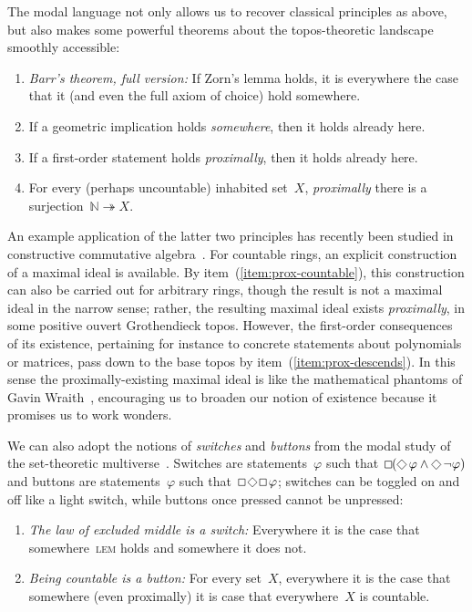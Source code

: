 \documentclass[oneside,reqno]{amsart}
\theoremstyle{definition}
\theoremstyle{plain}
\theoremstyle{remark}
\newcommand{\NN}{\mathbb{N}}
\renewcommand{\_}{\mathpunct{.}\,}
\DeclareMathOperator{\possible}{\text{\tikz[scale=.6ex/1cm,baseline=-.6ex,rotate=45,line width=.1ex]{\draw (-1,-1) rectangle (1,1);}}}
\DeclareMathOperator{\necessary}{\text{\tikz[scale=.6ex/1cm,baseline=-.6ex,line width=.1ex]{\draw (-1,-1) rectangle (1,1);}}}
\newcommand{\?}{\,{:}\,}
\begin{document}
The modal language not only allows us to recover classical principles
as above, but also makes some powerful theorems about the topos-theoretic
landscape smoothly accessible:
\begin{enumerate}
\addtocounter{enumi}{7}
\item \emph{Barr's theorem, full version:} If Zorn's lemma holds, it is
everywhere the case that it (and even the full axiom of choice) hold somewhere.
\item If a geometric implication holds \emph{somewhere}, then it holds already here.
\item \label{item:prox-descends}
If a first-order statement holds \emph{proximally}, then it holds already here.
\item \label{item:prox-countable}
For every (perhaps uncountable) inhabited set~$X$, \emph{proximally} there is a
surjection~$\NN \twoheadrightarrow X$.
\end{enumerate}
An example application of the latter two principles
has recently been studied in constructive
commutative algebra~\cite{blechschmidt-schuster:constructive-maximal-ideals}.
For countable rings, an explicit construction of a maximal ideal is available.
By item~(\ref{item:prox-countable}), this construction can also be carried out
for arbitrary rings, though the result is not a maximal ideal in the narrow
sense; rather, the resulting maximal ideal exists \emph{proximally}, in some
positive ouvert Grothendieck topos. However, the first-order consequences of
its existence, pertaining for instance to concrete statements about polynomials
or matrices, pass down to the base topos by item~(\ref{item:prox-descends}).
In this sense the proximally-existing maximal ideal is like the mathematical
phantoms of Gavin Wraith~\cite{xxx}, encouraging us to broaden our notion of
existence because it promises us to work wonders.

We can also adopt the notions of \emph{switches} and \emph{buttons} from the
modal study of the set-theoretic multiverse~\cite[xxx]{xxx}. Switches are
statements~$\varphi$ such that~$\necessary(\possible\varphi \wedge
\possible\neg\varphi)$ and buttons are statements~$\varphi$ such
that~$\necessary\possible\necessary\varphi$; switches can be toggled on and off
like a light switch, while buttons once pressed cannot be unpressed:
\begin{enumerate}
\addtocounter{enumi}{10}
\item \emph{The law of excluded middle is a switch:} Everywhere it is the case
that somewhere~\textsc{lem} holds and somewhere it does not.
\item \emph{Being countable is a button:} For every set~$X$, everywhere it is
the case that somewhere (even proximally) it is case that everywhere~$X$ is
countable.
\end{enumerate}
\end{document}
